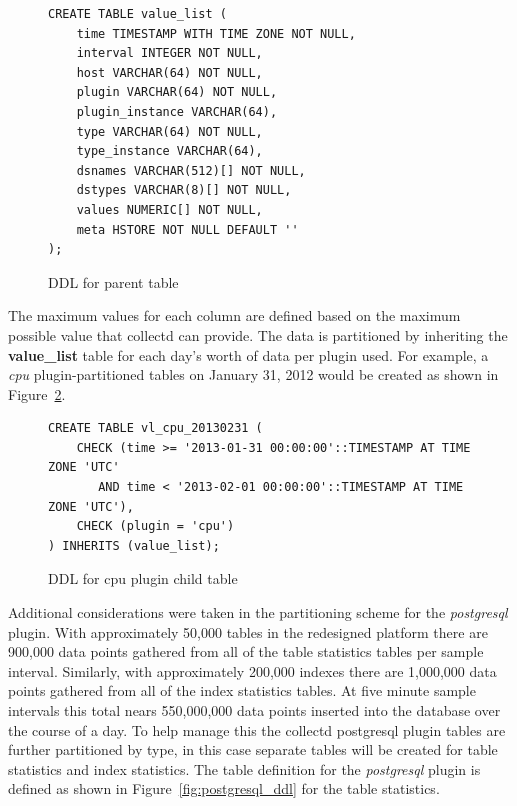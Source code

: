 \documentclass[twocolumn,letterpaper]{article}
\begin{document}
\begin{figure}
  \lstset{language=sql}
  \begin{lstlisting}
CREATE TABLE value_list (
    time TIMESTAMP WITH TIME ZONE NOT NULL,
    interval INTEGER NOT NULL,
    host VARCHAR(64) NOT NULL,
    plugin VARCHAR(64) NOT NULL,
    plugin_instance VARCHAR(64),
    type VARCHAR(64) NOT NULL,
    type_instance VARCHAR(64),
    dsnames VARCHAR(512)[] NOT NULL,
    dstypes VARCHAR(8)[] NOT NULL,
    values NUMERIC[] NOT NULL,
    meta HSTORE NOT NULL DEFAULT ''
);
  \end{lstlisting}
  \caption{DDL for parent table}
  \label{fig:parent_ddl}
\end{figure}

The maximum values for each column are defined based on the maximum possible
value that collectd can provide.  The data is partitioned by inheriting the
\textbf{value\_list} table for each day's worth of data per plugin used.  For
example, a \textit{cpu} plugin-partitioned tables on January 31, 2012 would be
created as shown in Figure~\ref{fig:cpu_ddl}.

\begin{figure}
  \lstset{language=sql}
  \begin{lstlisting}
CREATE TABLE vl_cpu_20130231 (
    CHECK (time >= '2013-01-31 00:00:00'::TIMESTAMP AT TIME ZONE 'UTC'
       AND time < '2013-02-01 00:00:00'::TIMESTAMP AT TIME ZONE 'UTC'),
    CHECK (plugin = 'cpu')
) INHERITS (value_list);
  \end{lstlisting}
  \caption{DDL for cpu plugin child table}
  \label{fig:cpu_ddl}
\end{figure}

Additional considerations were taken in the partitioning scheme for the
\textit{postgresql} plugin.  With approximately 50,000 tables in the redesigned
platform there are 900,000 data points gathered from all of the table
statistics tables per sample interval.  Similarly, with approximately 200,000
indexes there are 1,000,000 data points gathered from all of the index
statistics tables.  At five minute sample intervals this total nears
550,000,000 data points inserted into the database over the course of a day.
To help manage this the collectd postgresql plugin tables are further
partitioned by type, in this case separate tables will be created for table
statistics and index statistics.  The table definition for the
\textit{postgresql} plugin is defined as shown in
Figure~\ref{fig:postgresql_ddl} for the table statistics.
\end{document}
